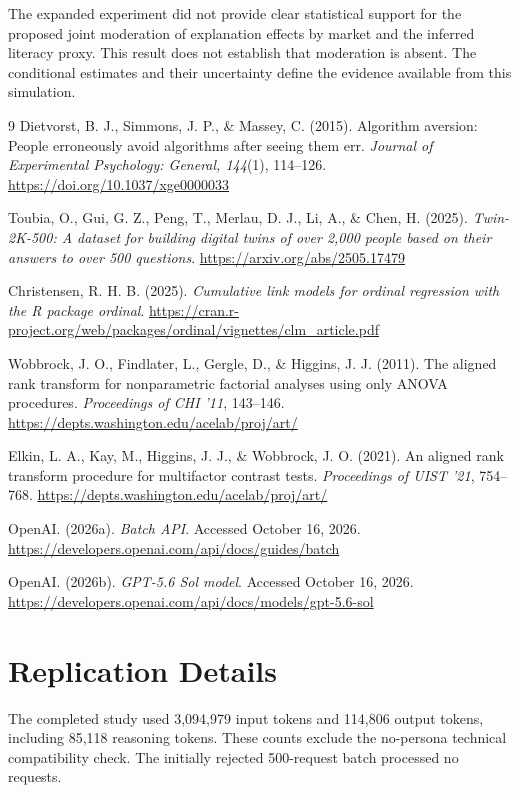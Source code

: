 \documentclass[11pt,a4paper]{article}
\newcommand{\ConclusionFinding}{The expanded experiment did not provide clear statistical support for the proposed joint moderation of explanation effects by market and the inferred literacy proxy. This result does not establish that moderation is absent. The conditional estimates and their uncertainty define the evidence available from this simulation.}
\begin{document}
\ConclusionFinding

\begin{thebibliography}{9}
Dietvorst, B. J., Simmons, J. P., \& Massey, C. (2015).
Algorithm aversion: People erroneously avoid algorithms after seeing them err.
\textit{Journal of Experimental Psychology: General, 144}(1), 114--126.
\url{https://doi.org/10.1037/xge0000033}

Toubia, O., Gui, G. Z., Peng, T., Merlau, D. J., Li, A., \& Chen, H. (2025).
\textit{Twin-2K-500: A dataset for building digital twins of over 2,000 people based on their answers to over 500 questions}.
\url{https://arxiv.org/abs/2505.17479}

Christensen, R. H. B. (2025).
\textit{Cumulative link models for ordinal regression with the R package ordinal}.
\url{https://cran.r-project.org/web/packages/ordinal/vignettes/clm_article.pdf}

Wobbrock, J. O., Findlater, L., Gergle, D., \& Higgins, J. J. (2011).
The aligned rank transform for nonparametric factorial analyses using only ANOVA procedures.
\textit{Proceedings of CHI '11}, 143--146.
\url{https://depts.washington.edu/acelab/proj/art/}

Elkin, L. A., Kay, M., Higgins, J. J., \& Wobbrock, J. O. (2021).
An aligned rank transform procedure for multifactor contrast tests.
\textit{Proceedings of UIST '21}, 754--768.
\url{https://depts.washington.edu/acelab/proj/art/}

OpenAI. (2026a). \textit{Batch API}. Accessed October 16, 2026.
\url{https://developers.openai.com/api/docs/guides/batch}

OpenAI. (2026b). \textit{GPT-5.6 Sol model}. Accessed October 16, 2026.
\url{https://developers.openai.com/api/docs/models/gpt-5.6-sol}
\end{thebibliography}

\clearpage
\appendix
\section{Replication Details}
The completed study used 3,094,979 input tokens and 114,806 output tokens, including 85,118 reasoning tokens. These counts exclude the no-persona technical compatibility check. The initially rejected 500-request batch processed no requests.
\end{document}
